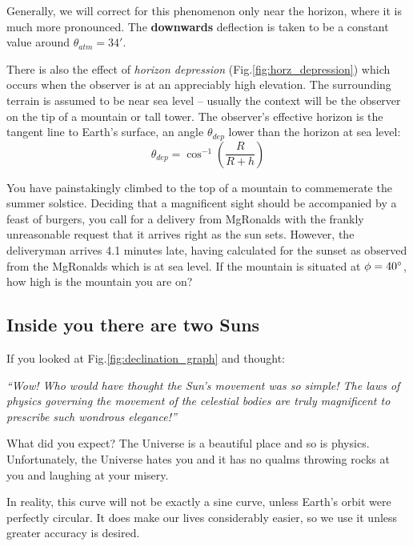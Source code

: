 \documentclass{article}
\begin{document}
Generally, we will correct for this phenomenon only near the horizon, where it is much more pronounced. The \textbf{downwards} deflection is taken to be a constant value around $\theta_{atm} = 34'$.

There is also the effect of \textit{horizon depression} (Fig.\;\ref{fig:horz_depression}) which occurs when the observer is at an appreciably high elevation. The surrounding terrain is assumed to be near sea level -- usually the context will be the observer on the tip of a mountain or tall tower. The observer's effective horizon is the tangent line to Earth's surface, an angle $\theta_{dep}$ lower than the horizon at sea level:
\begin{equation}
    \theta_{dep} = \cos^{-1} \left( \frac{R}{R+h} \right)
\end{equation}

\begin{Exercise}
You have painstakingly climbed to the top of a mountain to commemerate the summer solstice. Deciding that a magnificent sight should be accompanied by a feast of burgers, you call for a delivery from MgRonalds with the frankly unreasonable request that it arrives right as the sun sets. However, the deliveryman arrives 4.1 minutes late, having calculated for the sunset as observed from the MgRonalds which is at sea level. If the mountain is situated at $\phi = 40{}^{\circ}$, how high is the mountain you are on?
\end{Exercise}

\subsection{Inside you there are two Suns}
If you looked at Fig.\;\ref{fig:declination_graph} and thought: 
\begin{center}
    \textit{``Wow! Who would have thought the Sun's movement was so simple! The laws of physics governing the movement of the celestial bodies are truly magnificent to prescribe such wondrous elegance!''}
\end{center}

What did you expect? The Universe is a beautiful place and so is physics. Unfortunately, the Universe hates you and it has no qualms throwing rocks at you and laughing at your misery.

In reality, this curve will not be exactly a sine curve, unless Earth's orbit were perfectly circular. It does make our lives considerably easier, so we use it unless greater accuracy is desired.
\end{document}

